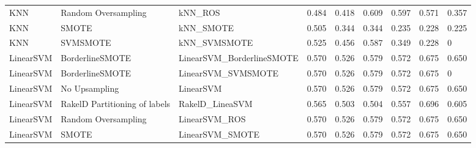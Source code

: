 \begin{tabular}{lllllllll}
                            KNN &           Random Oversampling &                                      kNN\_ROS & 0.484 &                     0.418 &                 0.609 &                  0.597 &                                   0.571 &     0.357 \\
                            KNN &                         SMOTE &                                    kNN\_SMOTE & 0.505 &                     0.344 &                 0.344 &                  0.235 &                                   0.228 &     0.225 \\
                            KNN &                      SVMSMOTE &                                 kNN\_SVMSMOTE & 0.525 &                     0.456 &                 0.587 &                  0.349 &                                   0.228 &         0 \\
                      LinearSVM &               BorderlineSMOTE &                    LinearSVM\_BorderlineSMOTE & 0.570 &                     0.526 &                 0.579 &                  0.572 &                                   0.675 &     0.650 \\
                      LinearSVM &               BorderlineSMOTE &                           LinearSVM\_SVMSMOTE & 0.570 &                     0.526 &                 0.579 &                  0.572 &                                   0.675 &         0 \\
                      LinearSVM &                 No Upsampling &                                    LinearSVM & 0.570 &                     0.526 &                 0.579 &                  0.572 &                                   0.675 &     0.650 \\
                      LinearSVM & RakelD Partitioning of labels &                              RakelD\_LineaSVM & 0.565 &                     0.503 &                 0.504 &                  0.557 &                                   0.696 &     0.605 \\
                      LinearSVM &           Random Oversampling &                                LinearSVM\_ROS & 0.570 &                     0.526 &                 0.579 &                  0.572 &                                   0.675 &     0.650 \\
                      LinearSVM &                         SMOTE &                              LinearSVM\_SMOTE & 0.570 &                     0.526 &                 0.579 &                  0.572 &                                   0.675 &     0.650 \\

\end{tabular}
